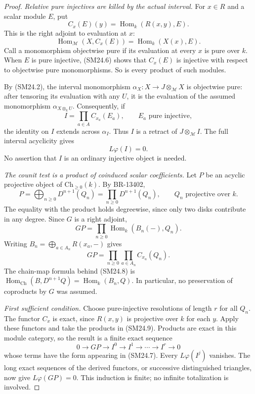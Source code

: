 \documentclass[11pt,a4paper]{article}
\theoremstyle{definition}\newtheorem{definition}[theorem]{Definition}
\theoremstyle{remark}\newtheorem{remark}[theorem]{Remark}
\begin{document}
\begin{proof}
\emph{Relative pure injectives are killed by the actual interval.}
For $x\in R$ and a scalar module $E$, put
\[
 C_x(E)(y)=\operatorname{Hom}_k(R(x,y),E).
 \tag{SM24.5}
\]
This is the right adjoint to evaluation at $x$:
\[
 \operatorname{Hom}_{\mathcal M}(X,C_x(E))
     =\operatorname{Hom}_k(X(x),E).
 \tag{SM24.6}
\]
Call a monomorphism objectwise pure if its evaluation at every
$x$ is pure over $k$. When $E$ is pure injective, (SM24.6)
shows that $C_x(E)$ is injective with respect to objectwise pure
monomorphisms. So is every product of such modules.

By (SM24.2), the interval monomorphism
$\alpha_X:X\to J\otimes_{\mathcal M}X$ is objectwise pure:
after tensoring its evaluation with any $U$, it is the evaluation
of the assumed monomorphism $\alpha_{X\otimes_k U}$.
Consequently, if
\[
 I=\prod_{a\in A} C_{x_a}(E_a),\qquad E_a\text{ pure injective},
\]
the identity on $I$ extends across $\alpha_I$.
Thus $I$ is a retract of $J\otimes_{\mathcal M}I$.
The full interval acyclicity gives
\[
 L\varphi(I)=0.
 \tag{SM24.7}
\]
No assertion that $I$ is an ordinary injective object is needed.

\emph{The counit test is a product of coinduced scalar coefficients.}
Let $P$ be an acyclic projective object of
$\mathrm{Ch}_{\geq0}(k)$. By BR-13402,
\[
 P=\bigoplus_{n\geq0}D^{n+1}(Q_n)
   =\prod_{n\geq0}D^{n+1}(Q_n),
 \qquad Q_n\text{ projective over }k.
\]
The equality with the product holds degreewise, since only two
disks contribute in any degree. Since $G$ is a right adjoint,
\[
 GP=\prod_{n\geq0}\operatorname{Hom}_k(B_n(-),Q_n).
 \tag{SM24.8}
\]
Writing $B_n=\bigoplus_{a\in A_n}R(x_a,-)$ gives
\[
 GP=\prod_{n\geq0}\prod_{a\in A_n} C_{x_a}(Q_n).
 \tag{SM24.9}
\]
The chain-map formula behind (SM24.8) is
$\operatorname{Hom}_{\mathrm{Ch}}(B,D^{n+1}Q)
=\operatorname{Hom}_k(B_n,Q)$.
In particular, no preservation of coproducts by $G$ was assumed.

\emph{First sufficient condition.}
Choose pure-injective resolutions of length $r$ for all $Q_n$.
The functor $C_x$ is exact, since $R(x,y)$ is projective over $k$
for each $y$. Apply these functors and take the products in
(SM24.9). Products are exact in this module category, so the
result is a finite exact sequence
\[
 0\longrightarrow GP\longrightarrow I^0\longrightarrow
       I^1\longrightarrow\cdots\longrightarrow I^r
       \longrightarrow0
\]
whose terms have the form appearing in (SM24.7).
Every $L\varphi(I^j)$ vanishes.
The long exact sequences of the derived functors, or successive
distinguished triangles, now give $L\varphi(GP)=0$.
This induction is finite; no infinite totalization is involved.


\end{proof}
\end{document}

